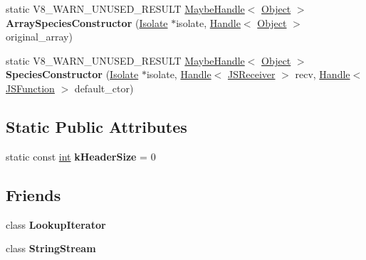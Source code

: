 \begin{DoxyCompactItemize}
\item 
\mbox{\label{classv8_1_1internal_1_1Object_a1dc48791219cb80d7f31f36fdd5a627c}} 
static V8\+\_\+\+W\+A\+R\+N\+\_\+\+U\+N\+U\+S\+E\+D\+\_\+\+R\+E\+S\+U\+LT \mbox{\hyperlink{classv8_1_1internal_1_1MaybeHandle}{Maybe\+Handle}}$<$ \mbox{\hyperlink{classv8_1_1internal_1_1Object}{Object}} $>$ {\bfseries Array\+Species\+Constructor} (\mbox{\hyperlink{classv8_1_1internal_1_1Isolate}{Isolate}} $\ast$isolate, \mbox{\hyperlink{classv8_1_1internal_1_1Handle}{Handle}}$<$ \mbox{\hyperlink{classv8_1_1internal_1_1Object}{Object}} $>$ original\+\_\+array)
\item 
\mbox{\label{classv8_1_1internal_1_1Object_acb419ca0f7ae669a9a6d670ded9555b0}} 
static V8\+\_\+\+W\+A\+R\+N\+\_\+\+U\+N\+U\+S\+E\+D\+\_\+\+R\+E\+S\+U\+LT \mbox{\hyperlink{classv8_1_1internal_1_1MaybeHandle}{Maybe\+Handle}}$<$ \mbox{\hyperlink{classv8_1_1internal_1_1Object}{Object}} $>$ {\bfseries Species\+Constructor} (\mbox{\hyperlink{classv8_1_1internal_1_1Isolate}{Isolate}} $\ast$isolate, \mbox{\hyperlink{classv8_1_1internal_1_1Handle}{Handle}}$<$ \mbox{\hyperlink{classv8_1_1internal_1_1JSReceiver}{J\+S\+Receiver}} $>$ recv, \mbox{\hyperlink{classv8_1_1internal_1_1Handle}{Handle}}$<$ \mbox{\hyperlink{classv8_1_1internal_1_1JSFunction}{J\+S\+Function}} $>$ default\+\_\+ctor)
\end{DoxyCompactItemize}
\subsection*{Static Public Attributes}
\begin{DoxyCompactItemize}
\item 
\mbox{\label{classv8_1_1internal_1_1Object_ad3351fa81dab11402a320cbc39482151}} 
static const \mbox{\hyperlink{classint}{int}} {\bfseries k\+Header\+Size} = 0
\end{DoxyCompactItemize}
\subsection*{Friends}
\begin{DoxyCompactItemize}
\item 
\mbox{\label{classv8_1_1internal_1_1Object_a44f614b48d67bab95d53634a26593e69}} 
class {\bfseries Lookup\+Iterator}
\item 
\mbox{\label{classv8_1_1internal_1_1Object_a1e02d3fa3aed0e038625842888f70c2a}} 
class {\bfseries String\+Stream}
\end{DoxyCompactItemize}


